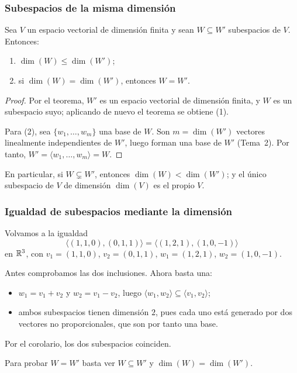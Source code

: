 \begin{frame}
    \frametitle{Subespacios de la misma dimensión}

    \begin{corollary}
        Sea $V$ un espacio vectorial de dimensión finita y sean
        $W\subseteq W'$ subespacios de $V$. Entonces:
        \begin{enumerate}
            \item $\dim(W)\leq\dim(W')$;
            \item si $\dim(W)=\dim(W')$, entonces $W=W'$.
        \end{enumerate}
    \end{corollary}

    \begin{proof}
        Por el teorema, $W'$ es un espacio vectorial de dimensión finita, y
        $W$ es un subespacio suyo; aplicando de nuevo el teorema se obtiene
        (1).

        Para (2), sea $\{w_1,\ldots,w_m\}$ una base de $W$. Son
        $m=\dim(W')$ vectores linealmente independientes de $W'$, luego
        forman una base de $W'$ (Tema~2). Por tanto,
        $W'=\langle w_1,\ldots,w_m\rangle=W$.
    \end{proof}

    \medskip

    En particular, si $W\subsetneq W'$, entonces $\dim(W)<\dim(W')$; y el
    único subespacio de $V$ de dimensión $\dim(V)$ es el propio $V$.
\end{frame}

\begin{frame}
    \frametitle{Igualdad de subespacios mediante la dimensión}

    \begin{example}
        Volvamos a la igualdad
        \[
            \langle(1,1,0),(0,1,1)\rangle=\langle(1,2,1),(1,0,-1)\rangle
        \]
        en $\mathbb{R}^3$, con $v_1=(1,1,0)$, $v_2=(0,1,1)$, $w_1=(1,2,1)$,
        $w_2=(1,0,-1)$.
    \end{example}

    \medskip

    Antes comprobamos las dos inclusiones. Ahora basta \alert{una}:
    \begin{itemize}
        \item $w_1=v_1+v_2$ y $w_2=v_1-v_2$, luego
        $\langle w_1,w_2\rangle\subseteq\langle v_1,v_2\rangle$;
        \item ambos subespacios tienen dimensión $2$, pues cada uno está
        generado por dos vectores no proporcionales, que son por tanto
        una base.
    \end{itemize}
    Por el corolario, los dos subespacios coinciden.

    \medskip

    Para probar $W=W'$ basta ver $W\subseteq W'$ y $\dim(W)=\dim(W')$.
\end{frame}

